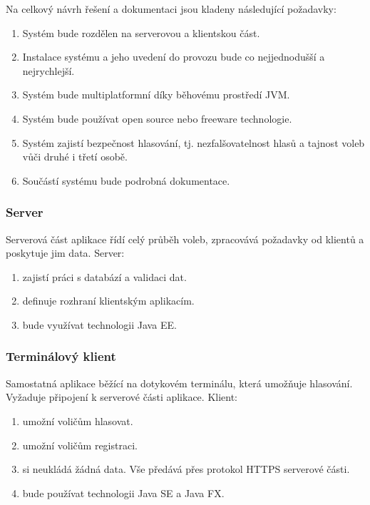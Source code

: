 \documentclass[11pt,twoside,a4paper]{book}
\begin{document}
Na celkový návrh řešení a dokumentaci jsou kladeny následující požadavky:

\begin{enumerate}
	\item Systém bude rozdělen na serverovou a klientskou část.
	\item Instalace systému a jeho uvedení do provozu bude co nejjednodušší a nejrychlejší.
	\item Systém bude multiplatformní díky běhovému prostředí JVM.
	\item Systém bude používat open source nebo freeware technologie.
	\item Systém zajistí bezpečnost hlasování, tj. nezfalšovatelnost hlasů a tajnost voleb vůči druhé i třetí osobě.
	\item Součástí systému bude podrobná dokumentace.
\end{enumerate}

\subsubsection{Server}

Serverová část aplikace řídí celý průběh voleb, zpracovává požadavky od klientů a poskytuje jim data. Server:

\begin{enumerate}
	\item zajistí práci s databází a validaci dat.
	\item definuje rozhraní klientským aplikacím.
	\item bude využívat technologii Java EE.
\end{enumerate}

\subsubsection{Terminálový klient}

Samostatná aplikace běžící na dotykovém terminálu, která umožňuje hlasování. Vyžaduje připojení k serverové části aplikace. Klient:

\begin{enumerate}
	\item umožní voličům hlasovat.
	\item umožní voličům registraci.
	\item si neukládá žádná data. Vše předává přes protokol HTTPS serverové části. 
	\item bude používat technologii Java SE a Java FX.
\end{enumerate}
\end{document}
